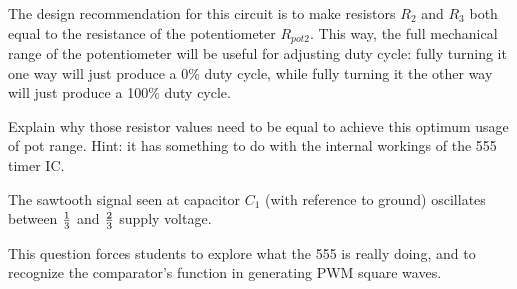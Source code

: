 

The design recommendation for this circuit is to make resistors $R_2$ and $R_3$ both equal to the resistance of the potentiometer $R_{pot2}$.  This way, the full mechanical range of the potentiometer will be useful for adjusting duty cycle: fully turning it one way will just produce a 0\% duty cycle, while fully turning it the other way will just produce a 100\% duty cycle.

Explain why those resistor values need to be equal to achieve this optimum usage of pot range.  Hint: it has something to do with the internal workings of the 555 timer IC.







The sawtooth signal seen at capacitor $C_1$ (with reference to ground) oscillates between ${1 \over 3}$ and ${2 \over 3}$ supply voltage.







This question forces students to explore what the 555 is really doing, and to recognize the comparator's function in generating PWM square waves.



